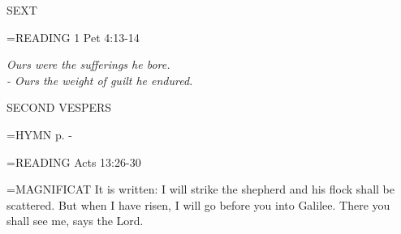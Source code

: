\begin{flushleft}\normalsize SEXT\\\end{flushleft}

\hangindent=\parindent \small{\uppercase{READING}}    1 Pet 4:13-14 \textbf{   \\}

\begin{center}
\textit{Ours were the sufferings he bore.\\
- Ours the weight of guilt he endured.}
\end{center}

\begin{flushleft}\normalsize SECOND VESPERS\\\end{flushleft}

\hangindent=\parindent \small{\uppercase{HYMN} p. \pageref{lent:firstHymn}-\pageref{lent:lastHymn}\\}

\hangindent=\parindent \small{\uppercase{READING}}    Acts 13:26-30 \textbf{   \\}

\hangindent=\parindent \small{MAGNIFICAT 	It is written: I will strike the shepherd and his flock shall be scattered. But when I have risen, I will go before you into Galilee. There you shall see me, says the Lord.\\}
